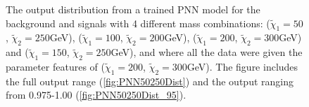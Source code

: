 \begin{figure}
    \caption{The output distribution from a trained \ac{PNN} model for the background and signals with 4 different mass combinations:
    ($\tilde{\chi}_1=50$, $\tilde{\chi}_2=250$GeV), ($\tilde{\chi}_1=100$, $\tilde{\chi}_2=200$GeV), 
    ($\tilde{\chi}_1=200$, $\tilde{\chi}_2=300$GeV) and ($\tilde{\chi}_1=150$, $\tilde{\chi}_2=250$GeV), and where all the data were given the 
    parameter features of ($\tilde{\chi}_1=200$, $\tilde{\chi}_2=300$GeV). The figure includes the full output range (\ref{fig:PNN50250Dist}) 
    and the output ranging from 0.975-1.00 (\ref{fig:PNN50250Dist_95}).}
    \label{fig:PNN200300DistComp}
\end{figure}
